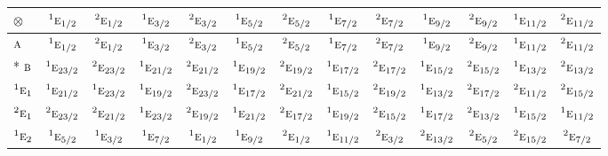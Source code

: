 \documentclass[10pt,a4paper]{article}
\numberwithin{equation}{section}
\newcommand{\irr}[1]{\text{\normalfont\scshape #1}}
\newcommand{\conjpair}[1]{{}^{#1}}
\newcommand{\irrprod}{\otimes}
\begin{document}
{\small\setlength{\tabcolsep}{3pt}\begin{longtable}{@{}lcccccccccccc@{}}\toprule
$\irrprod$ & $\conjpair{1}\irr{e}_{1/2}$ & $\conjpair{2}\irr{e}_{1/2}$ & $\conjpair{1}\irr{e}_{3/2}$ & $\conjpair{2}\irr{e}_{3/2}$ & $\conjpair{1}\irr{e}_{5/2}$ & $\conjpair{2}\irr{e}_{5/2}$ & $\conjpair{1}\irr{e}_{7/2}$ & $\conjpair{2}\irr{e}_{7/2}$ & $\conjpair{1}\irr{e}_{9/2}$ & $\conjpair{2}\irr{e}_{9/2}$ & $\conjpair{1}\irr{e}_{11/2}$ & $\conjpair{2}\irr{e}_{11/2}$\\\midrule\endhead
\bottomrule\endfoot\endlastfoot
$\irr{a}$ & $\conjpair{1}\irr{e}_{1/2}$ & $\conjpair{2}\irr{e}_{1/2}$ & $\conjpair{1}\irr{e}_{3/2}$ & $\conjpair{2}\irr{e}_{3/2}$ & $\conjpair{1}\irr{e}_{5/2}$ & $\conjpair{2}\irr{e}_{5/2}$ & $\conjpair{1}\irr{e}_{7/2}$ & $\conjpair{2}\irr{e}_{7/2}$ & $\conjpair{1}\irr{e}_{9/2}$ & $\conjpair{2}\irr{e}_{9/2}$ & $\conjpair{1}\irr{e}_{11/2}$ & $\conjpair{2}\irr{e}_{11/2}$\\*
$\irr{b}$ & $\conjpair{1}\irr{e}_{23/2}$ & $\conjpair{2}\irr{e}_{23/2}$ & $\conjpair{1}\irr{e}_{21/2}$ & $\conjpair{2}\irr{e}_{21/2}$ & $\conjpair{1}\irr{e}_{19/2}$ & $\conjpair{2}\irr{e}_{19/2}$ & $\conjpair{1}\irr{e}_{17/2}$ & $\conjpair{2}\irr{e}_{17/2}$ & $\conjpair{1}\irr{e}_{15/2}$ & $\conjpair{2}\irr{e}_{15/2}$ & $\conjpair{1}\irr{e}_{13/2}$ & $\conjpair{2}\irr{e}_{13/2}$\\
$\conjpair{1}\irr{e}_{1}$ & $\conjpair{1}\irr{e}_{21/2}$ & $\conjpair{1}\irr{e}_{23/2}$ & $\conjpair{1}\irr{e}_{19/2}$ & $\conjpair{2}\irr{e}_{23/2}$ & $\conjpair{1}\irr{e}_{17/2}$ & $\conjpair{2}\irr{e}_{21/2}$ & $\conjpair{1}\irr{e}_{15/2}$ & $\conjpair{2}\irr{e}_{19/2}$ & $\conjpair{1}\irr{e}_{13/2}$ & $\conjpair{2}\irr{e}_{17/2}$ & $\conjpair{2}\irr{e}_{11/2}$ & $\conjpair{2}\irr{e}_{15/2}$\\
$\conjpair{2}\irr{e}_{1}$ & $\conjpair{2}\irr{e}_{23/2}$ & $\conjpair{2}\irr{e}_{21/2}$ & $\conjpair{1}\irr{e}_{23/2}$ & $\conjpair{2}\irr{e}_{19/2}$ & $\conjpair{1}\irr{e}_{21/2}$ & $\conjpair{2}\irr{e}_{17/2}$ & $\conjpair{1}\irr{e}_{19/2}$ & $\conjpair{2}\irr{e}_{15/2}$ & $\conjpair{1}\irr{e}_{17/2}$ & $\conjpair{2}\irr{e}_{13/2}$ & $\conjpair{1}\irr{e}_{15/2}$ & $\conjpair{1}\irr{e}_{11/2}$\\
$\conjpair{1}\irr{e}_{2}$ & $\conjpair{1}\irr{e}_{5/2}$ & $\conjpair{1}\irr{e}_{3/2}$ & $\conjpair{1}\irr{e}_{7/2}$ & $\conjpair{1}\irr{e}_{1/2}$ & $\conjpair{1}\irr{e}_{9/2}$ & $\conjpair{2}\irr{e}_{1/2}$ & $\conjpair{1}\irr{e}_{11/2}$ & $\conjpair{2}\irr{e}_{3/2}$ & $\conjpair{2}\irr{e}_{13/2}$ & $\conjpair{2}\irr{e}_{5/2}$ & $\conjpair{2}\irr{e}_{15/2}$ & $\conjpair{2}\irr{e}_{7/2}$\\

\end{longtable}}
\end{document}
